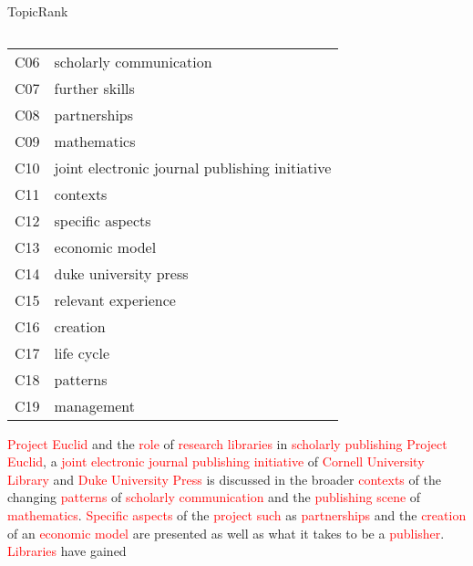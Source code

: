 \begin{frame}[label=topicrank]{TopicRank}
\begin{columns}
\begin{column}{.56\textwidth}
{{{{\begin{tabular}{cl}
                    C06 & scholarly communication\\
                    C07 & further skills\\
                    C08 & partnerships\\
                    C09 & mathematics\\
                    C10 & joint electronic journal publishing initiative\\
                    C11 & contexts\\
                    C12 & specific aspects\\
                    C13 & economic model\\
                    C14 & duke university press\\
                    C15 & relevant experience\\
                    C16 & creation\\
                    C17 & life cycle\\
                    C18 & patterns\\
                    C19 & management\\
                    \bottomrule
                  \end{tabular}
                }
              }
            }{ %
              \begin{exampleblock}{\footnotesize \textcolor{red}{Project Euclid}
                                   and the \textcolor{red}{role} of
                                   \textcolor{red}{research libraries} in
                                   \textcolor{red}{scholarly publishing}}
                \justifying
                \footnotesize \textcolor{red}{Project Euclid}, a
                \textcolor{red}{joint electronic journal publishing initiative}
                of \textcolor{red}{Cornell University Library} and
                \textcolor{red}{Duke University Press} is discussed in the
                broader \textcolor{red}{contexts} of the changing
                \textcolor{red}{patterns} of \textcolor{red}{scholarly
                communication} and the \textcolor{red}{publishing scene} of
                \textcolor{red}{mathematics}. \textcolor{red}{Specific aspects}
                of the \textcolor{red}{project such} as
                \textcolor{red}{partnerships} and the \textcolor{red}{creation}
                of an \textcolor{red}{economic model} are presented as well as
                what it takes to be a \textcolor{red}{publisher}.
                \textcolor{red}{Libraries} have gained

\end{exampleblock}}}
\end{column}
\end{columns}
\end{frame}
